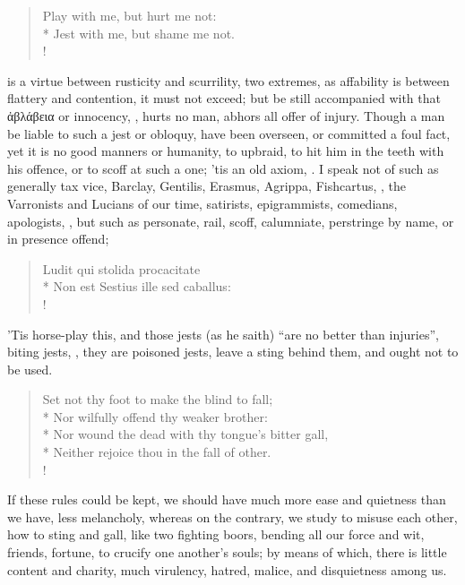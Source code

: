 \begin{verse}%
Play with me, but hurt me not:\\*
Jest with me, but shame me not.\\!
\end{verse}%

 is a virtue between rusticity and scurrility, two extremes, as
affability is between flattery and contention, it must not exceed; but be still
accompanied with that \textgreek{ἀβλάβεια} or innocency,
, hurts no man,
abhors all offer of injury. Though a man be liable to such a jest or obloquy,
have been overseen, or committed a foul fact, yet it is no good manners or
humanity, to upbraid, to hit him in the teeth with his offence, or to scoff at
such a one; 'tis an old axiom, . I speak not of such as generally tax vice,
Barclay, Gentilis, Erasmus, Agrippa, Fishcartus, \etc{}, the Varronists and
Lucians of our time, satirists, epigrammists, comedians, apologists, \etc{},
but such as personate, rail, scoff, calumniate, perstringe by name, or in
presence offend;

\begin{latin}
\begin{verse}%
Ludit qui stolida procacitate\\*
Non est Sestius ille sed caballus:\\!
\end{verse}%
\end{latin}

'Tis horse-play this, and those jests (as he saith) \enquote{are
no better than injuries}, biting jests, , they are
poisoned jests, leave a sting behind them, and ought not to be used.

\begin{verse}%
Set not thy foot to make the blind to fall;\\*
Nor wilfully offend thy weaker brother:\\*
Nor wound the dead with thy tongue's bitter gall,\\*
Neither rejoice thou in the fall of other.\\!
\end{verse}%

If these rules could be kept, we should have much more ease and quietness than
we have, less melancholy, whereas on the contrary, we study to misuse each
other, how to sting and gall, like two fighting boors, bending all our force
and wit, friends, fortune, to crucify one another's souls;
by means of which, there is little content and charity, much virulency, hatred,
malice, and disquietness among us.

